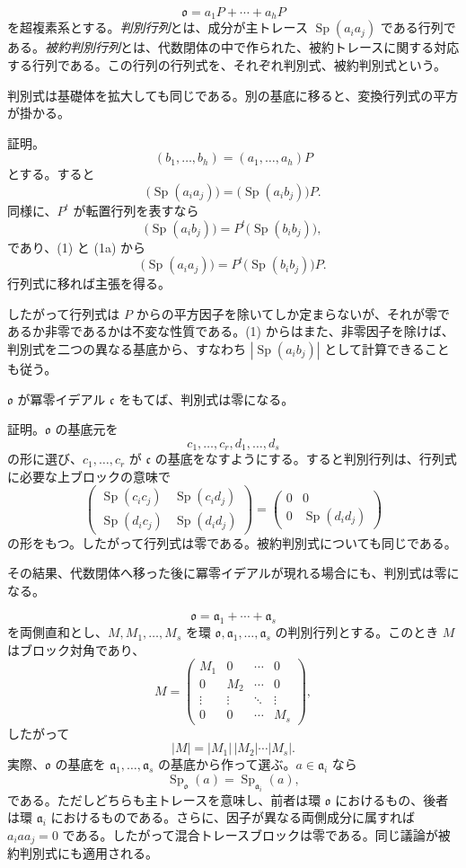 \documentclass[11pt]{article}
\providecommand{\mo}{\mathfrak{o}}
\providecommand{\ma}{\mathfrak{a}}
\providecommand{\mc}{\mathfrak{c}}
\begin{document}
\[
        \mo=a_1P+\cdots+a_hP
\]
を超複素系とする。\emph{判別行列}とは、成分が主トレース $\operatorname{Sp}(a_i a_j)$ である行列である。\emph{被約判別行列}とは、代数閉体の中で作られた、被約トレースに関する対応する行列である。この行列の行列式を、それぞれ判別式、被約判別式という。

判別式は基礎体を拡大しても同じである。別の基底に移ると、変換行列式の平方が掛かる。

証明。
\[
        (b_1,\ldots,b_h)=(a_1,\ldots,a_h)P
\]
とする。すると
\[
        \bigl(\operatorname{Sp}(a_i a_j)\bigr)=\bigl(\operatorname{Sp}(a_i b_j)\bigr)P.       \tag{1}
\]
同様に、$P^t$ が転置行列を表すなら
\[
        \bigl(\operatorname{Sp}(a_i b_j)\bigr)=P^t\bigl(\operatorname{Sp}(b_i b_j)\bigr),      \tag{1a}
\]
であり、(1) と (1a) から
\[
        \bigl(\operatorname{Sp}(a_i a_j)\bigr)=P^t\bigl(\operatorname{Sp}(b_i b_j)\bigr)P.
\]
行列式に移れば主張を得る。

したがって行列式は $P$ からの平方因子を除いてしか定まらないが、それが零であるか非零であるかは不変な性質である。(1) からはまた、非零因子を除けば、判別式を二つの異なる基底から、すなわち $|\operatorname{Sp}(a_i b_j)|$ として計算できることも従う。

$\mo$ が冪零イデアル $\mc$ をもてば、判別式は零になる。

証明。$\mo$ の基底元を
\[
        c_1,\ldots,c_r,d_1,\ldots,d_s
\]
の形に選び、$c_1,\ldots,c_r$ が $\mc$ の基底をなすようにする。すると判別行列は、行列式に必要な上ブロックの意味で
\[
        \begin{pmatrix}
        \operatorname{Sp}(c_i c_j)&\operatorname{Sp}(c_i d_j)\\
        \operatorname{Sp}(d_i c_j)&\operatorname{Sp}(d_i d_j)
        \end{pmatrix}
        =
        \begin{pmatrix}
        0&0\\
        0&\operatorname{Sp}(d_i d_j)
        \end{pmatrix}
\]
の形をもつ。したがって行列式は零である。被約判別式についても同じである。

その結果、代数閉体へ移った後に冪零イデアルが現れる場合にも、判別式は零になる。

\[
        \mo=\ma_1+\cdots+\ma_s
\]
を両側直和とし、$M,M_1,\ldots,M_s$ を環 $\mo,\ma_1,\ldots,\ma_s$ の判別行列とする。このとき $M$ はブロック対角であり、
\[
        M=\begin{pmatrix}
        M_1&0&\cdots&0\\
        0&M_2&\cdots&0\\
        \vdots&\vdots&\ddots&\vdots\\
        0&0&\cdots&M_s
        \end{pmatrix},
\]
したがって
\[
        |M|=|M_1|\,|M_2|\cdots |M_s|.
\]
実際、$\mo$ の基底を $\ma_1,\ldots,\ma_s$ の基底から作って選ぶ。$a\in\ma_i$ なら
\[
        \operatorname{Sp}_\mo(a)=\operatorname{Sp}_{\ma_i}(a),
\]
である。ただしどちらも主トレースを意味し、前者は環 $\mo$ におけるもの、後者は環 $\ma_i$ におけるものである。さらに、因子が異なる両側成分に属すれば $a_i a a_j=0$ である。したがって混合トレースブロックは零である。同じ議論が被約判別式にも適用される。
\end{document}
